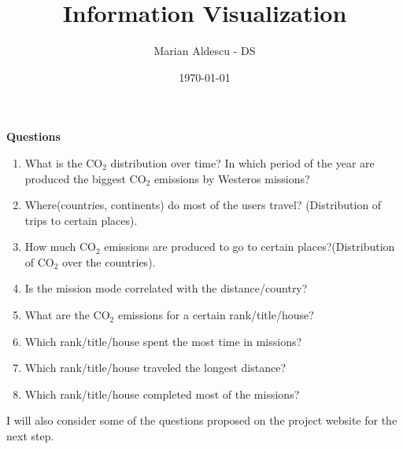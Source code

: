 \documentclass{article}
\title{Information Visualization}
\author{Marian Aldescu - DS}
\date{\today}
\begin{document}
\maketitle



\textbf{\large{Questions}}

\begin{enumerate}
	\item What is the CO$_2$ distribution over time? In which period of the year are produced the biggest CO${_2}$ emissions by Westeros missions?
	\item Where(countries, continents) do most of the users travel? (Distribution of trips to certain places).
	\item How much CO${_2}$ emissions are produced to go to certain places?(Distribution of CO$_2$ over the countries). 
	\item Is the mission mode correlated with the distance/country?
	\item What are the CO${_2}$ emissions for a certain rank/title/house?
	\item Which rank/title/house spent the most time in missions?
	\item Which rank/title/house traveled the longest distance?
	\item Which rank/title/house completed most of the missions?

\end{enumerate}



I will also consider some of the questions proposed on the project website for the next step.
\end{document}
